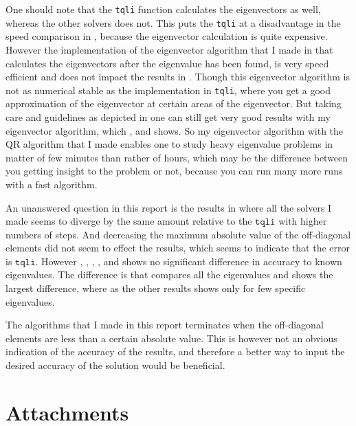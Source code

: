 \documentclass[11pt,english,a4paper]{article}
\begin{document}
\begin{flushleft}
One should note that the \texttt{tqli} function calculates the eigenvectors as well, whereas the other solvers does not. This puts the \texttt{tqli}  at a disadvantage in the speed comparison in , because the eigenvector calculation is quite expensive. However the implementation of the eigenvector algorithm that I made in \label{sec_Eigenvectors} that calculates the eigenvectors after the eigenvalue has been found, is very speed efficient and does not impact the results in . Though this eigenvector algorithm is not as numerical stable as the implementation in \texttt{tqli}, where you get a good approximation of the eigenvector at certain areas of the eigenvector. But taking care and guidelines as depicted in \label{sec_Eigenvectors} one can still get very good results with my eigenvector algorithm, which ,  and  shows. So my eigenvector algorithm with the QR algorithm that I made enables one to study heavy eigenvalue problems in matter of few minutes than rather of hours, which may be the difference between you getting insight to the problem or not, because you can run many more runs with a fast algorithm. \linebreak

An unanswered question in this report is the results in  where all the solvers I made seems to diverge by the same amount relative to the $\texttt{tqli}$ with higher numbers of steps. And decreasing the maximum absolute value of the off-diagonal elements did not seem to effect the results, which seems to indicate that the error is $\texttt{tqli}$. However , , , ,  and  shows no significant difference in accuracy to known eigenvalues. The difference is that   compares all the eigenvalues and shows the largest difference, where as the other results shows only for few specific eigenvalues. \linebreak

The algorithms that I made in this report terminates when the off-diagonal elements are less than a certain absolute value. This is however not an obvious indication of the accuracy of the results, and therefore a better way to input the desired accuracy of the solution would be beneficial.

\section{Attachments}


\end{flushleft}
\end{document}
